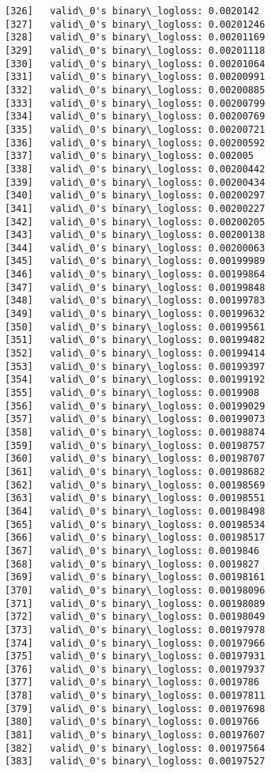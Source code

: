\documentclass[11pt]{article}
\begin{document}
\begin{Verbatim}[commandchars=\\\{\}]
[326]	valid\_0's binary\_logloss: 0.0020142
[327]	valid\_0's binary\_logloss: 0.00201246
[328]	valid\_0's binary\_logloss: 0.00201169
[329]	valid\_0's binary\_logloss: 0.00201118
[330]	valid\_0's binary\_logloss: 0.00201064
[331]	valid\_0's binary\_logloss: 0.00200991
[332]	valid\_0's binary\_logloss: 0.00200885
[333]	valid\_0's binary\_logloss: 0.00200799
[334]	valid\_0's binary\_logloss: 0.00200769
[335]	valid\_0's binary\_logloss: 0.00200721
[336]	valid\_0's binary\_logloss: 0.00200592
[337]	valid\_0's binary\_logloss: 0.002005
[338]	valid\_0's binary\_logloss: 0.00200442
[339]	valid\_0's binary\_logloss: 0.00200434
[340]	valid\_0's binary\_logloss: 0.00200297
[341]	valid\_0's binary\_logloss: 0.00200227
[342]	valid\_0's binary\_logloss: 0.00200205
[343]	valid\_0's binary\_logloss: 0.00200138
[344]	valid\_0's binary\_logloss: 0.00200063
[345]	valid\_0's binary\_logloss: 0.00199989
[346]	valid\_0's binary\_logloss: 0.00199864
[347]	valid\_0's binary\_logloss: 0.00199848
[348]	valid\_0's binary\_logloss: 0.00199783
[349]	valid\_0's binary\_logloss: 0.00199632
[350]	valid\_0's binary\_logloss: 0.00199561
[351]	valid\_0's binary\_logloss: 0.00199482
[352]	valid\_0's binary\_logloss: 0.00199414
[353]	valid\_0's binary\_logloss: 0.00199397
[354]	valid\_0's binary\_logloss: 0.00199192
[355]	valid\_0's binary\_logloss: 0.0019908
[356]	valid\_0's binary\_logloss: 0.00199029
[357]	valid\_0's binary\_logloss: 0.00199073
[358]	valid\_0's binary\_logloss: 0.00198874
[359]	valid\_0's binary\_logloss: 0.00198757
[360]	valid\_0's binary\_logloss: 0.00198707
[361]	valid\_0's binary\_logloss: 0.00198682
[362]	valid\_0's binary\_logloss: 0.00198569
[363]	valid\_0's binary\_logloss: 0.00198551
[364]	valid\_0's binary\_logloss: 0.00198498
[365]	valid\_0's binary\_logloss: 0.00198534
[366]	valid\_0's binary\_logloss: 0.00198517
[367]	valid\_0's binary\_logloss: 0.0019846
[368]	valid\_0's binary\_logloss: 0.0019827
[369]	valid\_0's binary\_logloss: 0.00198161
[370]	valid\_0's binary\_logloss: 0.00198096
[371]	valid\_0's binary\_logloss: 0.00198089
[372]	valid\_0's binary\_logloss: 0.00198049
[373]	valid\_0's binary\_logloss: 0.00197978
[374]	valid\_0's binary\_logloss: 0.00197966
[375]	valid\_0's binary\_logloss: 0.00197931
[376]	valid\_0's binary\_logloss: 0.00197937
[377]	valid\_0's binary\_logloss: 0.0019786
[378]	valid\_0's binary\_logloss: 0.00197811
[379]	valid\_0's binary\_logloss: 0.00197698
[380]	valid\_0's binary\_logloss: 0.0019766
[381]	valid\_0's binary\_logloss: 0.00197607
[382]	valid\_0's binary\_logloss: 0.00197564
[383]	valid\_0's binary\_logloss: 0.00197527

\end{Verbatim}
\end{document}
